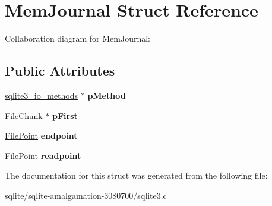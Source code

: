 \hypertarget{struct_mem_journal}{\section{Mem\+Journal Struct Reference}
\label{struct_mem_journal}
}


Collaboration diagram for Mem\+Journal\+:
\subsection*{Public Attributes}
\begin{DoxyCompactItemize}
\item 
\hypertarget{struct_mem_journal_a00c1523cce1bcfadc2b672b8703a78cb}{\hyperlink{structsqlite3__io__methods}{sqlite3\+\_\+io\+\_\+methods} $\ast$ {\bfseries p\+Method}}\label{struct_mem_journal_a00c1523cce1bcfadc2b672b8703a78cb}

\item 
\hypertarget{struct_mem_journal_ade7a6dea7b38a8a86f33476ae207765f}{\hyperlink{struct_file_chunk}{File\+Chunk} $\ast$ {\bfseries p\+First}}\label{struct_mem_journal_ade7a6dea7b38a8a86f33476ae207765f}

\item 
\hypertarget{struct_mem_journal_ac69637f95cfbce175cbeef00f71e59a9}{\hyperlink{struct_file_point}{File\+Point} {\bfseries endpoint}}\label{struct_mem_journal_ac69637f95cfbce175cbeef00f71e59a9}

\item 
\hypertarget{struct_mem_journal_a5645d38e1a488b62b5f63112628bf472}{\hyperlink{struct_file_point}{File\+Point} {\bfseries readpoint}}\label{struct_mem_journal_a5645d38e1a488b62b5f63112628bf472}

\end{DoxyCompactItemize}


The documentation for this struct was generated from the following file\+:\begin{DoxyCompactItemize}
\item 
sqlite/sqlite-\/amalgamation-\/3080700/sqlite3.\+c\end{DoxyCompactItemize}
